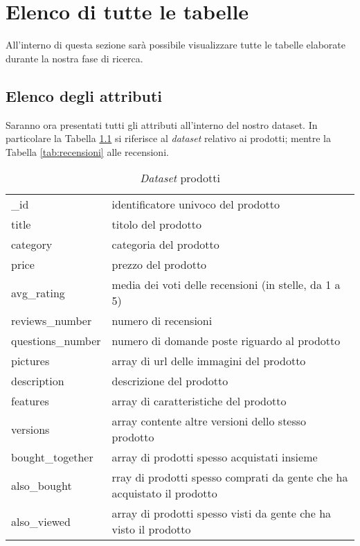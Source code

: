 \chapter{Elenco di tutte le tabelle}	
\label{cap:Tabelle}
	All'interno di questa sezione sarà possibile visualizzare tutte le tabelle elaborate durante la nostra fase di ricerca.
	
	\section{Elenco degli attributi}
		Saranno ora presentati tutti gli attributi all'interno del nostro dataset. In particolare la Tabella \ref{tab:prodotti} si riferisce al \textit{dataset} relativo ai prodotti; mentre la Tabella \ref{tab:recensioni} alle recensioni.
		\begin{table}[H]
			\caption{\textit{Dataset} prodotti}
			\label{tab:prodotti}
			\centering
			\begin{tabular}{ll}
				\toprule 
				\_id  & identificatore univoco del prodotto\\
				title  & titolo del prodotto \\
				category  & categoria del prodotto \\
				price  & prezzo del prodotto \\
				avg\_rating  & media dei voti delle recensioni (in stelle, da 1 a 5) \\
				reviews\_number  & numero di recensioni \\
				questions\_number  & numero di domande poste riguardo al prodotto \\
				pictures  & array di url delle immagini del prodotto \\
				description  & descrizione del prodotto \\
				features  & array di caratteristiche del prodotto \\
				versions  & array contente altre versioni dello stesso prodotto \\
				bought\_together  & array di prodotti spesso acquistati insieme \\
				also\_bought  & rray di prodotti spesso comprati da gente che ha acquistato il prodotto \\
				also\_viewed  & array di prodotti spesso visti da gente che ha visto il prodotto \\	
				\bottomrule
			\end{tabular}
		\end{table}
	
